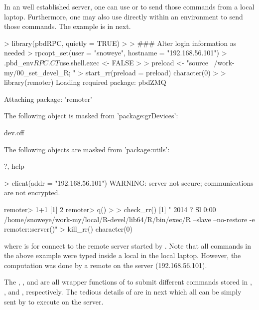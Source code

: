 In an well established server, one can use  or 
to send those commands from a local laptop.
Furthermore, one may also use  directly within an 
environment to send those commands. The example is in next.
\begin{Code}[title=Using \pkg{pbdRPC} to control \pkg{remoter}]
> library(pbdRPC, quietly = TRUE)
>
> ### Alter login information as needed
> rpcopt_set(user = "snoweye", hostname = "192.168.56.101")
> .pbd_env$RPC.CT$use.shell.exec <- FALSE
>
> preload <- "source ~/work-my/00_set_devel_R; "
> start_rr(preload = preload)
character(0)
>
> library(remoter)
Loading required package: pbdZMQ

Attaching package: 'remoter'

The following object is masked from 'package:grDevices':

    dev.off

The following objects are masked from 'package:utils':

    ?, help

> client(addr = "192.168.56.101")
WARNING: server not secure; communications are not encrypted.

remoter> 1+1
[1] 2 
remoter> q()
>
> check_rr()
[1] " 2014 ?        Sl     0:00 /home/snoweye/work-my/local/R-devel/lib64/R/bin/exec/R --slave --no-restore -e remoter::server()"
> kill_rr()
character(0)
\end{Code}
where  is for connect to the remote  server
started by .
Note that all commands in the above example were typed inside a
local  in the local laptop. However, the computation
 was done by a remote  on the server (192.168.56.101).

The , , and  are
all wrapper functions of  to submit different commands stored in
, , and
, respectively.
The tedious details of  are in next which all can be
simply sent by  to execute on the server.

